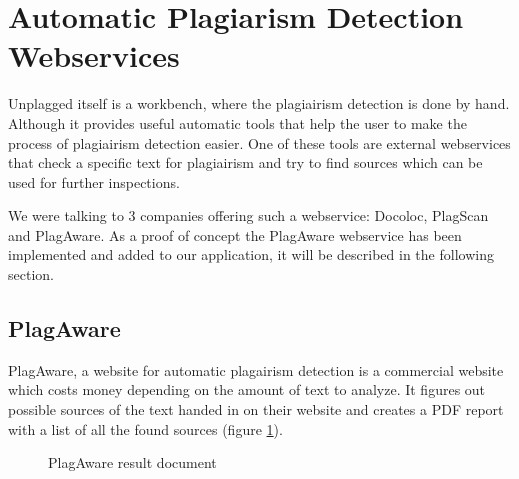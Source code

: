 \section{Automatic Plagiarism Detection Webservices}

Unplagged itself is a workbench, where the plagiairism detection is done by hand. Although it provides useful automatic tools that help the user to make the process of plagiairism detection easier. One of these tools are external webservices that check a specific text for plagiairism and try to find sources which can be used for further inspections.

We were talking to 3 companies offering such a webservice: Docoloc, PlagScan and PlagAware. As a proof of concept the PlagAware webservice has been implemented and added to our application, it will be described in the following section.

\subsection{PlagAware}

PlagAware, a website for automatic plagairism detection is a commercial website which costs money depending on the amount of text to analyze. It figures out possible sources of the text handed in on their website and creates a PDF report with a list of all the found sources (figure \ref{fig:plagaware-result}).

\begin{figure}[!h]
  \centering
  \caption{PlagAware result document}
  \label{fig:plagaware-result}
\end{figure}

